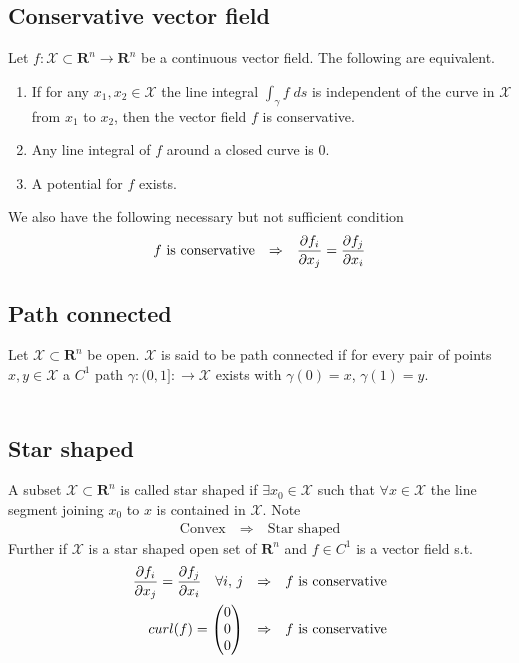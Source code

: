\documentclass[8pt]{extarticle}
\newcommand{\R}{{\mathbb R}}
\newcommand{\X}{{\mathcal X}}
\newcommand{\ra}{{\rightarrow}}
\newcommand{\Ra}{{\Rightarrow}}
\def\R{\mathbf{R}}
\begin{document}
\begin{multicols*}{3}
  \subsection{Conservative vector field}
  Let $f: \X \subset \R^n \ra \R^n$ be a continuous vector
  field. The following are equivalent.
  \begin{enumerate}[label=(\arabic*)]
    \item If for any $x_1, x_2 \in \X$ the line integral
          $\int_\gamma f \; ds$ is independent of the curve in $\X$
          from $x_1$ to $x_2$, then the vector field $f$ is conservative.
    \item Any line integral of $f$ around a closed curve is $0$.
    \item A potential for $f$ exists.
  \end{enumerate}
  We also have the following necessary but not sufficient
  condition
  \begin{align*}
    f \text{ is conservative} \quad \Ra \quad \pdv{f_i}{x_j} = \pdv{f_j}{x_i}
  \end{align*}
  \subsection{Path connected}
  Let $\X \subset \R^n$ be open. $\X$ is said to be path
  connected if for every pair of points $x, y \in \X$ a $C^1$
  path $\gamma: (0, 1]: \ra \X$ exists with $\gamma(0) = x$, $\gamma(1) = y$.\\ \\
  \subsection{Star shaped}
  A subset $\X \subset \R^n$ is called star shaped if $\exists x_0 \in \X$
  such that $\forall x \in \X$ the line segment joining $x_0$ to $x$
  is contained in $\X$. Note
  \begin{align*}
    \text{Convex} \quad \Ra \quad \text{Star shaped}
  \end{align*}
  Further if $\X$ is a star shaped open set of $\R^n$ and $f \in C^1$
  is a vector field s.t.
  \begin{align*}
    \pdv{f_i}{x_j} = \pdv{f_j}{x_i} \quad \forall i,\, j
    \quad & \Ra \quad \text{$f$ is conservative} \\
    curl(f) = \begin{pmatrix}
      0 \\0\\0
    \end{pmatrix}
    \quad & \Ra \quad \text{$f$ is conservative} \\
  \end{align*}

\end{multicols*}
\end{document}
